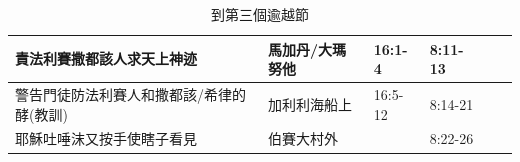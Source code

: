 \begin{table}[H]
\begin{tabular}{p{13.07em}|p{8.43em}|p{5.285em}|p{5.57em}|p{5.285em}|p{4.855em}}
責法利賽撒都該人求天上神迹& \multicolumn{1}{p{7.93em}|}{馬加丹/大瑪努他} & \multicolumn{1}{p{5.285em}|}{16:1-4} & \multicolumn{1}{p{5.57em}|}{8:11-13} & \multicolumn{1}{r|}{} &  \\ \midrule

警告門徒防法利賽人和撒都該/希律的酵(教訓)& \multicolumn{1}{p{7.93em}|}{加利利海船上} & \multicolumn{1}{p{5.285em}|}{16:5-12} & \multicolumn{1}{p{5.57em}|}{8:14-21} & \multicolumn{1}{r|}{} &  \\ \midrule

耶穌吐唾沫又按手使瞎子看見 & \multicolumn{1}{p{7.93em}|}{伯賽大村外} &       & \multicolumn{1}{p{5.57em}|}{8:22-26} &\multicolumn{1}{r|}{} &  \\ \midrule

\end{tabular}%
\caption{到第三個逾越節}
\label{tab:addlabel}%
\end{table}%

